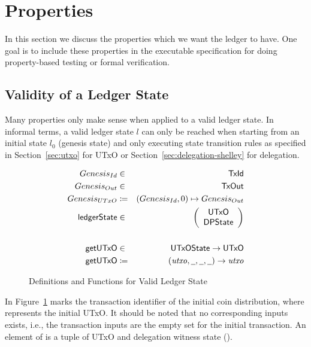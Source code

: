 \section{Properties}
\label{sec:properties}

In this section we discuss the properties which we want the ledger to have. One
goal is to include these properties in the executable specification for doing
property-based testing or formal verification.

\subsection{Validity of a Ledger State}
\label{sec:valid-ledg-state}

Many properties only make sense when applied to a valid ledger state. In
informal terms, a valid ledger state $l$ can only be reached when starting from
an initial state $l_{0}$ (genesis state) and only executing state transition
rules as specified in Section~\ref{sec:utxo} for UTxO or
Section~\ref{sec:delegation-shelley} for delegation.

\begin{figure}[ht]
  \centering
  \begin{align*}
    \genesisId & \in & \TxId \\
    \genesisTxOut & \in & \TxOut \\
    \genesisUTxO & \coloneqq & (\genesisId, 0) \mapsto \genesisTxOut
    \\
    \ledgerState & \in & \left(
                         \begin{array}{c}
                           \UTxO \\
                           \DPState
                         \end{array}
    \right)\\
               && \\
    \fun{getUTxO} & \in & \UTxOState \to \UTxO \\
    \fun{getUTxO} & \coloneqq & (\var{utxo}, \wcard, \wcard, \wcard) \to \var{utxo}
  \end{align*}
  \caption{Definitions and Functions for Valid Ledger State}
  \label{fig:valid-ledger}
\end{figure}

In Figure~\ref{fig:valid-ledger} \genesisId{} marks the transaction identifier
of the initial coin distribution, where \genesisTxOut{} represents the initial
UTxO. It should be noted that no corresponding inputs exists, i.e., the
transaction inputs are the empty set for the initial transaction. An element of
\ledgerState{} is a tuple of UTxO and delegation witness state (\DPState).

